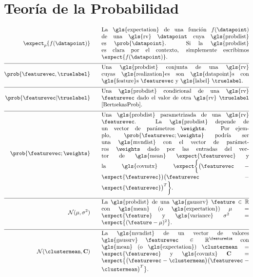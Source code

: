 \section*{Teoría de la Probabilidad} 
\begin{align}
	\expect_{p} \{ f(\datapoint) \}  \quad\quad & \parbox{.75\textwidth}{La \gls{expectation} de una función $f(\datapoint)$ de una \gls{rv} 
		$\datapoint$ cuya \gls{probdist} es $\prob{\datapoint}$. Si la \gls{probdist} es clara por el contexto, 
		simplemente escribimos $\expect \{ f(\datapoint) \}$. }  \nonumber \\[2mm] \hline \nonumber\\[-5mm]    
	\prob{\featurevec,\truelabel} \quad\quad & \parbox{.75\textwidth}{Una \gls{probdist} conjunta de una \gls{rv} 
		cuyas \gls{realization}es son \gls{datapoint}s con \gls{feature}s $\featurevec$ y \gls{label} $\truelabel$.} \nonumber        \nonumber \\[2mm] \hline \nonumber\\[-5mm]        
	\prob{\featurevec|\truelabel} \quad\quad & \parbox{.75\textwidth}{Una \gls{probdist} condicional de una \gls{rv} 
		$\featurevec$ dado el valor de otra \gls{rv} $\truelabel$ \cite[Sec.\ 3.5]{BertsekasProb}. } \nonumber       \nonumber \\[2mm] \hline \nonumber\\[-5mm]           
	\prob{\featurevec;\weights} \quad\quad & \parbox{.75\textwidth}{Una \gls{probdist} parametrizada de una \gls{rv} $\featurevec$. 
		La \gls{probdist} depende de un vector de parámetros $\weights$. Por ejemplo, $\prob{\featurevec;\weights}$ podría ser una 
		\gls{mvndist} con el vector de parámetros $\weights$ dado por las entradas del vector de \gls{mean} $\expect \{ \featurevec \}$ 
		y la \gls{covmtx} $\expect \bigg \{ \big( \featurevec - \expect \{ \featurevec \}\big) \big( \featurevec - \expect \{ \featurevec \}\big)^{T}  \bigg\}$.} \nonumber           \nonumber \\[2mm] \hline \nonumber\\[-5mm]
	\mathcal{N}(\mu, \sigma^{2}) \quad\quad & \parbox{.75\textwidth}{La \gls{probdist} de una 
		\gls{gaussrv} $\feature \in \mathbb{R}$ con \gls{mean} (o \gls{expectation}) $\mu= \expect \{ \feature \}$ 
		y \gls{variance} $\sigma^{2} =   \expect \big\{  (  \feature - \mu )^2 \big\}$.} \nonumber    \nonumber \\[2mm] \hline \nonumber\\[-5mm]
	\mathcal{N}(\clustermean, \mathbf{C}) \quad\quad & \parbox{.75\textwidth}{La \gls{mvndist} de un vector de valores 
		\gls{gaussrv} $\featurevec \in \mathbb{R}^{\featuredim}$ con \gls{mean} (o \gls{expectation}) $\clustermean= \expect \{ \featurevec \}$ 
		y \gls{covmtx} $\mathbf{C} =  \expect \big\{ \big( \featurevec - \clustermean \big)\big( \featurevec - \clustermean \big)^{T} \big\}$.} \nonumber                                             
\end{align}






